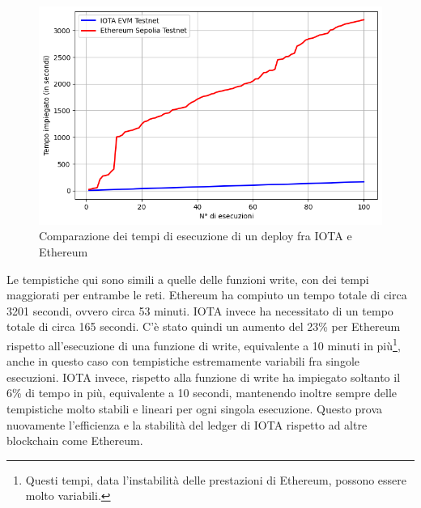 \documentclass[12pt,a4paper,openright,twoside]{report}
\begin{document}
\begin{figure}[h]
\begin{center}
\includegraphics[width=\textwidth]{figures/my_deploy_runtime.png}
\caption[Tempi di esecuzione deploy]{Comparazione dei tempi di esecuzione di un deploy fra IOTA e Ethereum}\label{fig:deploy_runtime}
\end{center}
\end{figure}
Le tempistiche qui sono simili a quelle delle funzioni write, con dei tempi maggiorati per entrambe le reti. Ethereum ha compiuto un tempo totale di circa 3201 secondi, ovvero circa 53 minuti. IOTA invece ha necessitato di un tempo totale di circa 165 secondi. C'è stato quindi un aumento del 23\% per Ethereum rispetto all'esecuzione di una funzione di write, equivalente a 10 minuti in più\footnote{Questi tempi, data l'instabilità delle prestazioni di Ethereum, possono essere molto variabili.}, anche in questo caso con tempistiche estremamente variabili fra singole esecuzioni. IOTA invece, rispetto alla funzione di write ha impiegato soltanto il 6\% di tempo in più, equivalente a 10 secondi, mantenendo inoltre sempre delle tempistiche molto stabili e lineari per ogni singola esecuzione. Questo prova nuovamente l'efficienza e la stabilità del ledger di IOTA rispetto ad altre blockchain come Ethereum.

\clearpage{\pagestyle{empty}\cleardoublepage}



\end{document}
